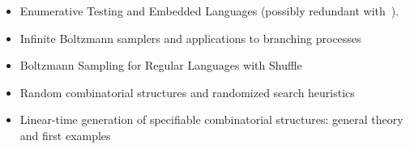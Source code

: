 \begin{itemize}
\item Enumerative Testing and Embedded Languages\cite{duregaard2012enumerative} (possibly redundant with~\cite{DBLP:phd/basesearch/Duregard16}).
\item Infinite Boltzmann samplers and applications to branching processes\cite{bodini2012infinite}
\item Boltzmann Sampling for Regular Languages with Shuffle\cite{darrasse2010boltzmann}
\item Random combinatorial structures and randomized search heuristics\cite{DBLP:phd/de/Johannsen2010}
\item Linear-time generation of specifiable combinatorial structures: general theory and first examples\cite{DBLP:journals/corr/BassinoS13}
\end{itemize}

